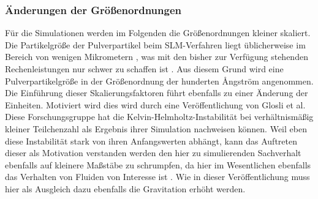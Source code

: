 		\subsubsection{Änderungen der Größenordnungen}
		Für die Simulationen werden im Folgenden die Größenordnungen kleiner skaliert. Die
		Partikelgröße der Pulverpartikel beim SLM-Verfahren liegt üblicherweise im Bereich von
		wenigen Mikrometern \cite{hajnys2020research}, was mit den bisher zur Verfügung stehenden
		Rechenleistungen nur schwer zu schaffen ist \cite{eckhardt2013scientists}. Aus diesem
		Grund wird eine Pulverpartikelgröße in der Größenordnung der hunderten \AA ngström
		angenommen. Die Einführung dieser Skalierungsfaktoren führt ebenfalls zu einer Änderung
		der Einheiten. Motiviert wird dies wird durch eine Veröffentlichung von Glosli et al.
		Diese Forschungsgruppe hat die Kelvin-Helmholtz-Instabilität bei verhältnismäßig kleiner
		Teilchenzahl als Ergebnis ihrer Simulation nachweisen können. Weil eben diese Instabilität
		stark von ihren Anfangswerten abhängt, kann das Auftreten dieser als Motivation verstanden
		werden den hier zu simulierenden Sachverhalt ebenfalls auf kleinere Maßstäbe zu
		schrumpfen, da hier im Wesentlichen ebenfalls das Verhalten von Fluiden von Interesse ist
		\cite{glosli2007extending}. Wie in dieser Veröffentlichung muss hier als Ausgleich dazu
		ebenfalls die Gravitation erhöht werden.


